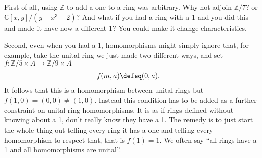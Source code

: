 First of all, using $\mathbb{Z}$ to add a one to a ring 
was arbitrary.  Why not adjoin $\mathbb{Z}/7$?  or $\mathbb{C}[x,y]/(y-x^3+2)$?
And what if you had a ring with a 1 and you did this and made it have now 
a different 1?  You could make it change characteristics.

Second, even when you had a 1, homomorphisms might simply ignore that, 
for example, take the unital ring we just made two different ways, 
and set $f:\mathbb{Z}/5\times A\to \mathbb{Z}/9\times A$
\begin{align*}
    f(m,a) & \defeq (0,a).
\end{align*}
It follows that this is a homomorphism between unital rings but 
$f(1,0)=(0,0)\neq (1,0)$.  Instead this condition has to be 
added as a further constraint on unital ring homomorphisms.
It is as if rings defined without knowing about a 1, don't really 
know they have a 1.  The remedy is to just start the whole thing 
out telling every ring it has a one and telling every homomorphism
to respect that, that is $f(1)=1$.  We often say ``all rings have a 1 and all homomorphisms are unital''.

